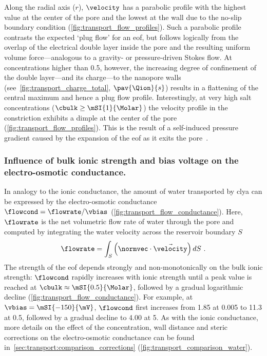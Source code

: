 Along the radial axis ($r$), $\velocity$ has a parabolic profile with the highest value at the center of the
pore and the lowest at the wall due to the no-slip boundary condition (\cref{fig:transport_flow_profiles}).
Such a parabolic profile contrasts the expected `plug flow' for an \gls{eof}, but follows logically from the
overlap of the electrical double layer inside the pore and the resulting uniform volume force---analogous to a
gravity- or pressure-driven Stokes flow. At concentrations higher than \SI{0.5}{\Molar}, however, the
increasing degree of confinement of the double layer---and its charge---to the nanopore walls
(see~\cref{fig:transport_charge_total}, $\pav{\Qion}{s}$) results in a flattening of the central maximum and
hence a plug flow profile. Interestingly, at very high salt concentrations ($\cbulk \ge \mSI{1}{\Molar}$) the
velocity profile in the constriction exhibits a dimple at the center of the pore
(\cref{fig:transport_flow_profiles}). This is the result of a self-induced pressure gradient caused by the
expansion of the \gls{eof} as it exits the pore~\cite{Melnikov-2017}.

\subsubsection{Influence of bulk ionic strength and bias voltage on the electro-osmotic conductance.}
%
In analogy to the ionic conductance, the amount of water transported by \gls{clya} can be expressed by the
electro-osmotic conductance $\flowcond = \flowrate / \vbias$ (\cref{fig:transport_flow_conductance}). Here,
$\flowrate$ is the net volumetric flow rate of water through the pore and computed by integrating the water
velocity across the reservoir boundary $S$
%
\begin{align}\label{eq:flowrate}
  \flowrate = \int_{S}\left(\normvec\cdot\vec{\velocity}\right)dS
  \text{ .}
\end{align}
%
The strength of the \gls{eof} depends strongly and non-monotonically on the bulk ionic strength: $\flowcond$
rapidly increases with ionic strength until a peak value is reached at $\cbulk \approx \mSI{0.5}{\Molar}$,
followed by a gradual logarithmic decline (\cref{fig:transport_flow_conductance}). For example, at $\vbias =
\mSI{-150}{\mV}$, $\flowcond$ first increases from \SI{1.85}{\cnmpnspv} at \SI{0.005}{\Molar} to
\SI{11.3}{\cnmpnspv} at \SI{0.5}{\Molar}, followed by a gradual decline to \SI{4.00}{\cnmpnspv} at
\SI{5}{\Molar}. As with the ionic conductance, more details on the effect of the concentration, wall distance
and steric corrections on the electro-osmotic conductance can be found
in~\cref{sec:transport:comparison_corrections} (\cref{fig:transport_comparison_water}).

